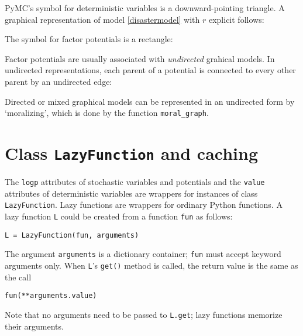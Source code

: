 PyMC's symbol for deterministic variables is a downward-pointing triangle. A graphical representation of model \ref{disastermodel} with $r$ explicit follows:
\begin{center}
\end{center}

The symbol for factor potentials is a rectangle:
\begin{center}
\end{center}
Factor potentials are usually associated with \emph{undirected} grahical models. In undirected representations, each parent of a potential is connected to every other parent by an undirected edge:
\begin{center}
\end{center}

Directed or mixed graphical models can be represented in an undirected form by `moralizing', which is done by the function \texttt{moral_graph}.


\section*{Class \texttt{LazyFunction} and caching}
\label{sec:caching} 

The \texttt{logp} attributes of stochastic variables and potentials and the \texttt{value} attributes of deterministic variables are wrappers for instances of class \texttt{LazyFunction}. Lazy functions are wrappers for ordinary Python functions. A lazy function \texttt{L} could be created from a function \texttt{fun} as follows:
\begin{verbatim}
L = LazyFunction(fun, arguments)
\end{verbatim}
The argument \texttt{arguments} is a dictionary container; \texttt{fun} must accept keyword arguments only. When \texttt{L}'s \texttt{get()} method is called, the return value is the same as the call 
\begin{verbatim}
fun(**arguments.value)
\end{verbatim}
Note that no arguments need to be passed to \texttt{L.get}; lazy functions memorize their arguments.


